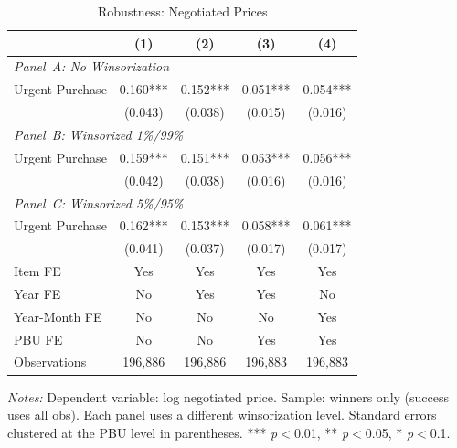 \begin{table}[ht]
  \centering
  \caption{Robustness: Negotiated Prices}
  \label{tab:rob_neg_prices}
  \small
  \begin{threeparttable}
  \begin{tabular}{lcccc}
    \hline\hline
    & (1) & (2) & (3) & (4) \\
    \hline
    \multicolumn{5}{l}{\textit{Panel~A: No Winsorization}} \\[3pt]
    Urgent Purchase & 0.160*** & 0.152*** & 0.051*** & 0.054*** \\
     & (0.043) & (0.038) & (0.015) & (0.016) \\[3pt]
    \hline
    \multicolumn{5}{l}{\textit{Panel~B: Winsorized 1\%/99\%}} \\[3pt]
    Urgent Purchase & 0.159*** & 0.151*** & 0.053*** & 0.056*** \\
     & (0.042) & (0.038) & (0.016) & (0.016) \\[3pt]
    \hline
    \multicolumn{5}{l}{\textit{Panel~C: Winsorized 5\%/95\%}} \\[3pt]
    Urgent Purchase & 0.162*** & 0.153*** & 0.058*** & 0.061*** \\
     & (0.041) & (0.037) & (0.017) & (0.017) \\[3pt]
    \hline
    Item FE & Yes & Yes & Yes & Yes \\
    Year FE & No & Yes & Yes & No \\
    Year-Month FE & No & No & No & Yes \\
    PBU FE & No & No & Yes & Yes \\
    Observations & 196,886 & 196,886 & 196,883 & 196,883 \\
    \hline\hline
  \end{tabular}
  \begin{tablenotes}
    \small
    \item \textit{Notes:} Dependent variable: log negotiated price. Sample: winners only (success uses all obs). Each panel uses a different winsorization level. Standard errors clustered at the PBU level in parentheses. *** \textit{p}$<$0.01, ** \textit{p}$<$0.05, * \textit{p}$<$0.1.
  \end{tablenotes}
  \end{threeparttable}
\end{table}

